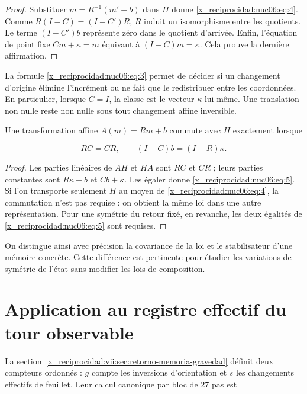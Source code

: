 \begin{proof}
Substituer \(m=R^{-1}(m'-b)\) dans \(H\) donne \eqref{x_reciprocidad:nuc06:eq:4}. Comme \(R(I-C)=(I-C')R\), \(R\) induit un isomorphisme entre les quotients. Le terme \((I-C')b\) représente zéro dans le quotient d’arrivée. Enfin, l’équation de point fixe \(Cm+\kappa=m\) équivaut à \((I-C)m=\kappa\). Cela prouve la dernière affirmation.
\end{proof}

La formule \eqref{x_reciprocidad:nuc06:eq:3} permet de décider si un changement d’origine élimine l’incrément ou ne fait que le redistribuer entre les coordonnées. En particulier, lorsque \(C=I\), la classe est le vecteur \(\kappa\) lui-même. Une translation non nulle reste non nulle sous tout changement affine inversible.

\begin{proposition}

Une transformation affine \(A(m)=Rm+b\) commute avec \(H\) exactement lorsque

\begin{equation}
RC=CR,\qquad (I-C)b=(I-R)\kappa.
\label{x_reciprocidad:nuc06:eq:5}
\end{equation}
\end{proposition}

\begin{proof}
Les parties linéaires de \(AH\) et \(HA\) sont \(RC\) et \(CR\) ; leurs parties constantes sont \(R\kappa+b\) et \(Cb+\kappa\). Les égaler donne \eqref{x_reciprocidad:nuc06:eq:5}. Si l’on transporte seulement \(H\) au moyen de \eqref{x_reciprocidad:nuc06:eq:4}, la commutation n’est pas requise : on obtient la même loi dans une autre représentation. Pour une symétrie du retour fixé, en revanche, les deux égalités de \eqref{x_reciprocidad:nuc06:eq:5} sont requises.
\end{proof}

On distingue ainsi avec précision la covariance de la loi et le stabilisateur d’une mémoire concrète. Cette différence est pertinente pour étudier les variations de symétrie de l’état sans modifier les lois de composition.

\section{Application au registre effectif du tour observable}

La section~\ref{x_reciprocidad:vii:sec:retorno-memoria-gravedad} définit deux compteurs ordonnés : \(g\) compte les inversions d’orientation et \(s\) les changements effectifs de feuillet. Leur calcul canonique par bloc de 27 pas est

